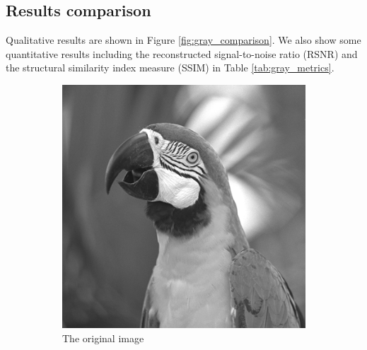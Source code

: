 \documentclass{article}
\begin{document}
\subsection*{Results comparison} \label{sec:results_gray}
Qualitative results are shown in Figure \ref{fig:gray_comparison}. We also show some quantitative results including the reconstructed signal-to-noise ratio (RSNR) and the structural similarity index measure (SSIM) in Table \ref{tab:gray_metrics}.
\begin{figure}[htbp]     
    \centering
    \begin{subfigure}[b]{0.24\textwidth}
        \centering
        \includegraphics[width=\textwidth]{images/gray.png}
        \caption{The original image}
        \label{fig:gray}
    \end{subfigure}
    \hfill
    \begin{subfigure}[b]{0.24\textwidth}
        \centering

\end{subfigure}
\end{figure}
\end{document}
